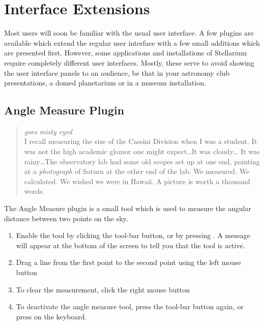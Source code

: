 
\chapter{Interface Extensions}
\label{ch:plugins:Interfaces}

Most users will soon be familiar with the usual user interface. A few
plugins are available which extend the regular user interface with a
few small additions which are presented first.  However, some
applications and installations of Stellarium require completely
different user interfaces. Mostly, these serve to avoid showing the
user interface panels to an audience, be that in your astronomy club
presentations, a domed planetarium or in a museum installation.


\section{Angle Measure Plugin}
\label{sec:plugins:AngleMeasure}

\begin{quotation}\small
\noindent\emph{goes misty eyed}\\ 
I recall measuring the size of the Cassini Division when I was a student.
It was not the high academic glamor one might expect\ldots It was cloudy\ldots
It was rainy\ldots The observatory lab had some old scopes set up at one
end, pointing at a \emph{photograph} of Saturn at the other end of the
lab. We measured. We calculated. We wished we were in Hawaii. A picture
is worth a thousand words.
\end{quotation}


\noindent The Angle Measure plugin is a small tool which is used to measure the
angular distance between two points on the sky. 



\begin{enumerate}
\item Enable the tool by clicking the tool-bar button, or by pressing
  . A message will appear at the bottom of the screen to
  tell you that the tool is active.
\item Drag a line from the first point to the second point using the
  left mouse button
\item To clear the measurement, click the right mouse button
\item To deactivate the angle measure tool, press the tool-bar button
  again, or press  on the keyboard.
\end{enumerate}

